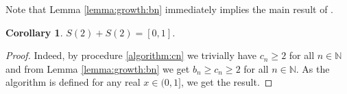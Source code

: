\documentclass{amsart}
\newtheorem{lemma}[theorem]{Lemma}
\newtheorem{corollary}[theorem]{Corollary}
\theoremstyle{definition}
\newtheorem{remark}[theorem]{Remark}
\newcommand{\N}{\mathbb N}%
\newcommand{\0}{\mbf 0}%
\def\N{\mathbb N}
\begin{document}
    



Note that Lemma \ref{lemma:growth:bn} immediately implies the main result of \cite{MR0269603}.

\begin{corollary}\label{coroll:cusick}
     $S(2)+S(2)=[0,1]$.
     \end{corollary}
     \begin{proof}
     Indeed, by procedure \eqref{algorithm:cn} we trivially have $c_n\geq2$ for all $n\in\N$ and from Lemma \ref{lemma:growth:bn} we get $b_n\geq c_n\geq2$ for all $n\in\N$. As the algorithm is defined for any real $x\in(0,1]$, we get the result.
     \end{proof}








\end{document}
